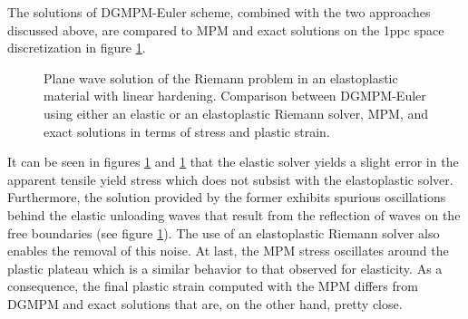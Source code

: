 The solutions of DGMPM-Euler scheme, combined with the two approaches discussed above, are compared to MPM and exact solutions on the 1ppc space discretization in figure \ref{fig:RP_EP_dgmpm_mpm}. 
\begin{figure}[h!]
  \centering
  { \label{subfig:ep_dgmpm_mpm1}}
  { \label{subfig:ep_dgmpm_mpm2}}
  { \label{subfig:ep_dgmpm_mpm3}}
  {}
  \caption{Plane wave solution of the Riemann problem in an elastoplastic material with linear hardening. Comparison between DGMPM-Euler using either an elastic or an elastoplastic Riemann solver, MPM, and exact solutions in terms of stress and plastic strain.}
  \label{fig:RP_EP_dgmpm_mpm}
\end{figure}
It can be seen in figures \ref{fig:RP_EP_dgmpm_mpm} and \ref{fig:RP_EP_dgmpm_mpm} that the elastic solver yields a slight error in the apparent tensile yield stress which does not subsist with the elastoplastic solver. Furthermore, the solution provided by the former exhibits spurious oscillations behind the elastic unloading waves that result from the reflection of waves on the free boundaries (see figure \ref{fig:RP_EP_dgmpm_mpm}). The use of an elastoplastic Riemann solver also enables the removal of this noise. At last, the MPM stress oscillates around the plastic plateau which is a similar behavior to that observed for elasticity. As a consequence, the final plastic strain computed with the MPM differs from DGMPM and exact solutions that are, on the other hand, pretty close.


